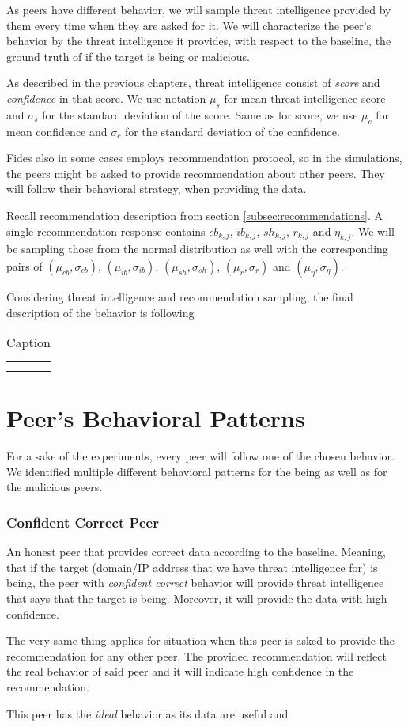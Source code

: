 As peers have different behavior, we will sample threat intelligence provided by them every time when they are asked for it.
We will characterize the peer's behavior by the threat intelligence it provides, with respect to the baseline, the ground truth of if the target is being or malicious.

As described in the previous chapters, threat intelligence consist of \textit{score} and \textit{confidence} in that score.
We use notation $\mu_{s}$ for mean threat intelligence score and $\sigma_{s}$ for the standard deviation of the score. 
Same as for score, we use $\mu_{c}$ for mean confidence and $\sigma_{c}$ for the standard deviation of the confidence. 

Fides also in some cases employs recommendation protocol, so in the simulations, the peers might be asked to provide recommendation about other peers.
They will follow their behavioral strategy, when providing the data. 

Recall recommendation description from section \ref{subsec:recommendations}. A single recommendation response contains $cb_{k,j}$, $ib_{k,j}$, $sh_{k,j}$, $r_{k,j}$ and $\eta_{k,j}$. 
We will be sampling those from the normal distribution as well with the corresponding pairs of $(\mu_{cb}, \sigma_{cb})$, $(\mu_{ib}, \sigma_{ib})$, $(\mu_{sh}, \sigma_{sh})$, $(\mu_{r}, \sigma_{r})$ and $(\mu_{\eta}, \sigma_{\eta})$.

Considering threat intelligence and recommendation sampling, the final description of the behavior is following
\begin{table}[]
    \centering
    \begin{tabular}{c|c}
         &  \\
         & 
    \end{tabular}
    \caption{Caption}
    \label{tab:my_label}
\end{table}

\section{Peer's Behavioral Patterns}
\label{sec:peers-behavioral-patterns}
For a sake of the experiments, every peer will follow one of the chosen behavior. 
We identified multiple different behavioral patterns for the being as well as for the malicious peers.

\subsubsection{Confident Correct Peer}
An honest peer that provides correct data according to the baseline. Meaning, that if the target (domain/IP address that we have threat intelligence for) is being, the peer with \textit{confident correct} behavior will provide threat intelligence that says that the target is being. 
Moreover, it will provide the data with high confidence.

The very same thing applies for situation when this peer is asked to provide the recommendation for any other peer. 
The provided recommendation will reflect the real behavior of said peer and it will indicate high confidence in the recommendation.

This peer has the \textit{ideal} behavior as its data are useful and 